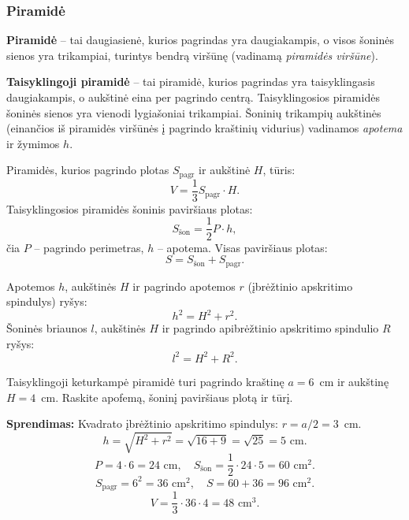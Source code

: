 \subsubsection*{Piramidė}

\begin{definition}
\textbf{Piramidė} -- tai daugiasienė, kurios pagrindas yra daugiakampis, o visos šoninės sienos yra trikampiai, turintys bendrą viršūnę (vadinamą \emph{piramidės viršūne}).

\textbf{Taisyklingoji piramidė} -- tai piramidė, kurios pagrindas yra taisyklingasis daugiakampis, o aukštinė eina per pagrindo centrą. Taisyklingosios piramidės šoninės sienos yra vienodi lygiašoniai trikampiai. Šoninių trikampių aukštinės (einančios iš piramidės viršūnės į pagrindo kraštinių vidurius) vadinamos \emph{apotema} ir žymimos $h$.
\end{definition}

\begin{theorem}
Piramidės, kurios pagrindo plotas $S_{\text{pagr}}$ ir aukštinė $H$, tūris:
\[
V = \frac{1}{3} S_{\text{pagr}} \cdot H.
\]
Taisyklingosios piramidės šoninis paviršiaus plotas:
\[
S_{\text{šon}} = \frac{1}{2} P \cdot h,
\]
čia $P$ -- pagrindo perimetras, $h$ -- apotema. Visas paviršiaus plotas:
\[
S = S_{\text{šon}} + S_{\text{pagr}}.
\]
\end{theorem}

\begin{remark}
Apotemos $h$, aukštinės $H$ ir pagrindo apotemos $r$ (įbrėžtinio apskritimo spindulys) ryšys:
\[
h^2 = H^2 + r^2.
\]
Šoninės briaunos $l$, aukštinės $H$ ir pagrindo apibrėžtinio apskritimo spindulio $R$ ryšys:
\[
l^2 = H^2 + R^2.
\]
\end{remark}

\begin{example}
Taisyklingoji keturkampė piramidė turi pagrindo kraštinę $a = 6$~cm ir aukštinę $H = 4$~cm. Raskite apofemą, šoninį paviršiaus plotą ir tūrį.

\textbf{Sprendimas:} Kvadrato įbrėžtinio apskritimo spindulys: $r = a/2 = 3$~cm.
\[
h = \sqrt{H^2 + r^2} = \sqrt{16 + 9} = \sqrt{25} = 5 \text{ cm}.
\]
\[
P = 4 \cdot 6 = 24 \text{ cm}, \quad S_{\text{šon}} = \frac{1}{2} \cdot 24 \cdot 5 = 60 \text{ cm}^2.
\]
\[
S_{\text{pagr}} = 6^2 = 36 \text{ cm}^2, \quad S = 60 + 36 = 96 \text{ cm}^2.
\]
\[
V = \frac{1}{3} \cdot 36 \cdot 4 = 48 \text{ cm}^3.
\]
\end{example}

